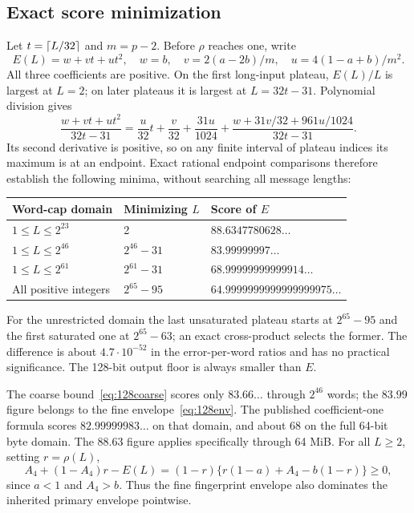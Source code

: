 \subsection{Exact score minimization}
Let $t=\left\lceil L/32\right\rceil$ and $m=p-2$. Before $\rho$ reaches one, write
\[
 E(L)=w+vt+ut^2,\quad w=b,\quad v=2(a-2b)/m,\quad u=4(1-a+b)/m^2.
\]
All three coefficients are positive. On the first long-input plateau, $E(L)/L$ is largest at $L=2$; on later plateaus it is largest at $L=32t-31$. Polynomial division gives
\[
 \frac{w+vt+ut^2}{32t-31}
 =\frac{u}{32}t+\frac v{32}+\frac{31u}{1024}
 +\frac{w+31v/32+961u/1024}{32t-31}.
\]
Its second derivative is positive, so on any finite interval of plateau indices its maximum is at an endpoint. Exact rational endpoint comparisons therefore establish the following minima, without searching all message lengths:
\begin{center}
\begin{tabular}{@{}lll@{}}\toprule
Word-cap domain&Minimizing $L$&Score of $E$\\\midrule
$1\le L\le2^{23}$&2&$88.6347780628\ldots$\\
$1\le L\le2^{46}$&$2^{46}-31$&$83.99999997\ldots$\\
$1\le L\le2^{61}$&$2^{61}-31$&$68.99999999999914\ldots$\\
All positive integers&$2^{65}-95$&$64.9999999999999999975\ldots$\\\bottomrule
\end{tabular}
\end{center}
For the unrestricted domain the last unsaturated plateau starts at $2^{65}-95$ and the first saturated one at $2^{65}-63$; an exact cross-product selects the former. The difference is about $4.7\cdot10^{-52}$ in the error-per-word ratios and has no practical significance. The 128-bit output floor is always smaller than $E$.

The coarse bound~\eqref{eq:128coarse} scores only $83.66\ldots$ through $2^{46}$ words; the $83.99$ figure belongs to the fine envelope~\eqref{eq:128env}. The published coefficient-one formula scores $82.99999983\ldots$ on that domain, and about 68 on the full 64-bit byte domain. The 88.63 figure applies specifically through 64 MiB. For all $L\ge2$, setting $r=\rho(L)$,
\[
 A_4+(1-A_4)r-E(L)=(1-r)\{r(1-a)+A_4-b(1-r)\}\ge0,
\]
since $a<1$ and $A_4>b$. Thus the fine fingerprint envelope also dominates the inherited primary envelope pointwise.

